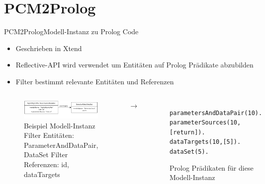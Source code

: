 \documentclass{sdqbeamer}
\begin{document}
\section{PCM2Prolog}
\begin{frame}{PCM2Prolog}{Modell-Instanz zu Prolog Code}
	\begin{itemize}
		\item Geschrieben in Xtend
		\item Reflective-API wird verwendet um Entitäten auf Prolog Prädikate abzubilden
		\item Filter bestimmt relevante Entitäten und Referenzen
	\end{itemize}
\vspace{0.05\textheight}	
	\begin{columns}
		\centering
		\begin{figure}
			\includegraphics[width=\textwidth]{images/pcm2prologUml.pdf}
			\caption{Beispiel Modell-Instanz \linebreak Filter Entitäten: ParameterAndDataPair, DataSet \linebreak Filter Referenzen: id, dataTargets}
		\end{figure}
		\centering
		$\rightarrow$
		\begin{figure}\raggedright 
		\texttt{parametersAndDataPair(10).\\
			parameterSources(10,[return]).\\
			dataTargets(10,[5]).\\ \vspace{0.025\textheight}
			dataSet(5).}
		\caption{Prolog Prädikaten für diese Modell-Instanz}
		\end{figure}
	\end{columns}
\end{frame}	
\end{document}
